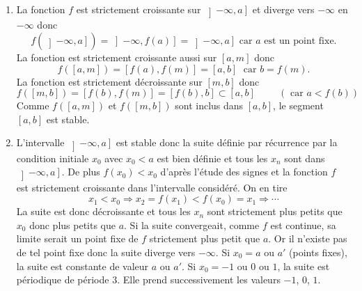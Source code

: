 \begin{enumerate}
  \item La fonction $f$ est strictement croissante sur $\left] -\infty , a\right]$ et diverge vers $-\infty$ en $-\infty$ donc
\begin{displaymath}
  f\left( \left]  -\infty , a\right]\right) = \left]  -\infty , f(a)\right] = \left] -\infty , a\right] \text{ car $a$ est un point fixe.}
\end{displaymath}
La fonction est strictement croissante aussi sur $\left[ a, m \right]$ donc 
\begin{displaymath}
  f\left( \left[ a, m \right]\right) = \left[ f(a) , f(m) \right] = \left[ a, b \right] \; \text{ car } b = f(m).
\end{displaymath}
La fonction est strictement décroissante sur $\left[ m, b \right]$ donc 
\begin{displaymath}
  f\left( \left[ m, b \right]\right) = \left[ f(b) , f(m) \right] = \left[ f(b), b \right]\subset \left[ a,b\right] \hspace{1cm}\left( \text{ car } a < f(b)\right) 
\end{displaymath}
Comme $f\left( \left[ a, m \right]\right)$ et $f\left( \left[ m, b \right]\right)$ sont inclus dans $\left[ a,b\right]$, le segment $\left[ a,b\right]$ est stable.  
  \item L'intervalle $\left] -\infty , a\right]$ est stable donc la suite définie par récurrence par la condition initiale $x_0$ avec $x_0<a$ est bien définie et tous les $x_n$ sont dans $\left] -\infty , a\right]$. De plus $f(x_0)<x_0$ d'après l'étude des signes et la fonction $f$ est strictement croissante dans l'intervalle considéré. On en tire
\begin{displaymath}
  x_1 < x_0 \Rightarrow x_2 = f(x_1) < f(x_0) = x_1 \Rightarrow \cdots 
\end{displaymath}
La suite est donc décroissante et tous les $x_n$ sont strictement plus petits que $x_0$ donc plus petits que $a$. Si la suite convergeait, comme $f$ est continue, sa limite serait un point fixe de $f$ strictement plus petit que $a$. Or il n'existe pas de tel point fixe donc la suite diverge vers $-\infty$.\newline
Si $x_0=a$ ou $a'$ (points fixes), la suite est constante de valeur $a$ ou $a'$.\newline
Si $x_0=-1$ ou $0$ ou $1$, la suite est périodique de période $3$. Elle prend successivement les valeurs $-1$, $0$, $1$.
\end{enumerate}

